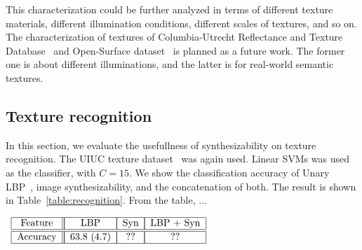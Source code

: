 This characterization could be further analyzed in terms of different
texture materials, different illumination conditions, different scales
of textures, and so on. The characterization of textures of
Columbia-Utrecht Reflectance and Texture
Database~\cite{columbia:texture} and Open-Surface
dataset~\cite{open:surface} is planned as a future work. The former
one is about different illuminations, and the latter is for real-world
semantic textures.

\subsection{Texture recognition}
In this section, we evaluate the usefullness of synthesizability on
texture recognition. The UIUC texture dataset~\cite{UIUC:Texture} was again used. Linear SVMs was used
as the classifier, with $C=15$. We show the classification accuracy of
Unary LBP~\cite{lbp}, image synthesizability, and the concatenation of
both. The result is shown in Table~\ref{table:recognition}. From the table, ...

\begin{table}[tb] \footnotesize 
$\begin{array}{ccccc}
\begin{tabular}{|c||c||}
\hline 
\multicolumn{1}{|c||}{Feature} \\ \hline \hline
Accuracy \\  \hline
\end{tabular}

\begin{tabular}{|c|c|}
\hline
\multicolumn{1}{|c|}{LBP} \\ \hline \hline
63.8 (4.7)  \\ \hline
\end{tabular}

\begin{tabular}{|c|c|}
\hline 
\multicolumn{1}{|c|}{Syn} \\ \hline \hline
??   \\  \hline
\end{tabular}

\begin{tabular}{|c|c|}
\hline 
\multicolumn{1}{|c|}{LBP + Syn} \\ \hline \hline
??   \\  \hline
\end{tabular}
\end{array} $
\vspace{1mm}
\centering 
\caption{ Texture classification accuracy on Texture-25 dataset. 
} \label{table:recognition}
\end{table}
